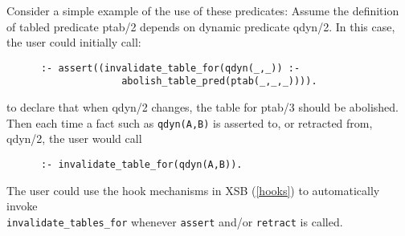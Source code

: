 \begin{description}
\begin{description}
Consider a simple example of the use of these predicates: Assume the
definition of tabled predicate ptab/2 depends on dynamic predicate
qdyn/2.  In this case, the user could initially call:
\begin{verbatim}
      :- assert((invalidate_table_for(qdyn(_,_)) :-
                    abolish_table_pred(ptab(_,_,_)))).
\end{verbatim}
to declare that when qdyn/2 changes, the table for ptab/3 should be
abolished.  Then each time a fact such as {\tt qdyn(A,B)} is
asserted to, or retracted from, qdyn/2, the user would call
\begin{verbatim}
      :- invalidate_table_for(qdyn(A,B)).
\end{verbatim}

The user could use the hook mechanisms in XSB (\ref{hooks}) to
automatically invoke \\ {\tt invalidate\_tables\_for} whenever {\tt assert}
and/or {\tt retract} is called.

\end{description}







\end{description}
